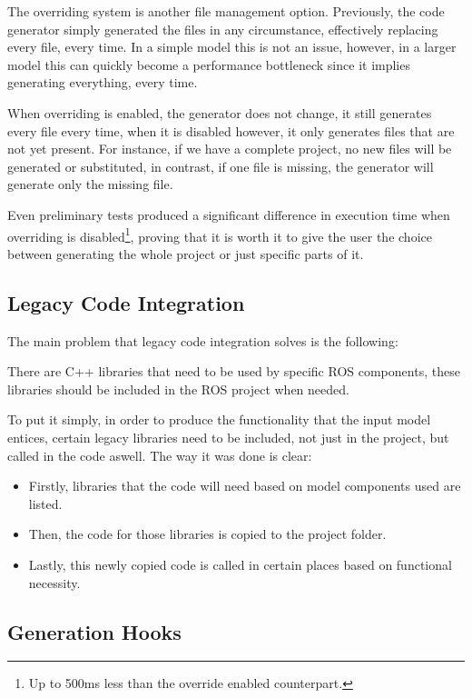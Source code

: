 The overriding system is another file management option. Previously, the code generator simply generated the files in any circumstance, effectively replacing every file, every time. In a simple model this is not an issue, however, in a larger model this can quickly become a performance bottleneck since it implies generating everything, every time. 

When overriding is enabled, the generator does not change, it still generates every file every time, when it is disabled however, it only generates files that are not yet present. For instance, if we have a complete project, no new files will be generated or substituted, in contrast, if one file is missing, the generator will generate only the missing file.

Even preliminary tests produced a significant difference in execution time when overriding is disabled\footnote{Up to 500ms less than the override enabled counterpart.}, proving that it is worth it to give the user the choice between generating the whole project or just specific parts of it.

\subsection{Legacy Code Integration}
\label{sec:impl_legacy_code}

The main problem that legacy code integration solves is the following:

There are C++ libraries that need to be used by specific \gls{ROS} components, these libraries should be included in the \gls{ROS} project when needed.

To put it simply, in order to produce the functionality that the input model entices, certain legacy libraries need to be included, not just in the project, but called in the code aswell. The way it was done is clear:

\begin{itemize} 
	\item Firstly, libraries that the code will need based on model components used are listed.
	\item Then, the code for those libraries is copied to the project folder.
	\item Lastly, this newly copied code is called in certain places based on functional necessity.
\end{itemize}

\subsection{Generation Hooks}
\label{sec:impl_gen_hooks}


